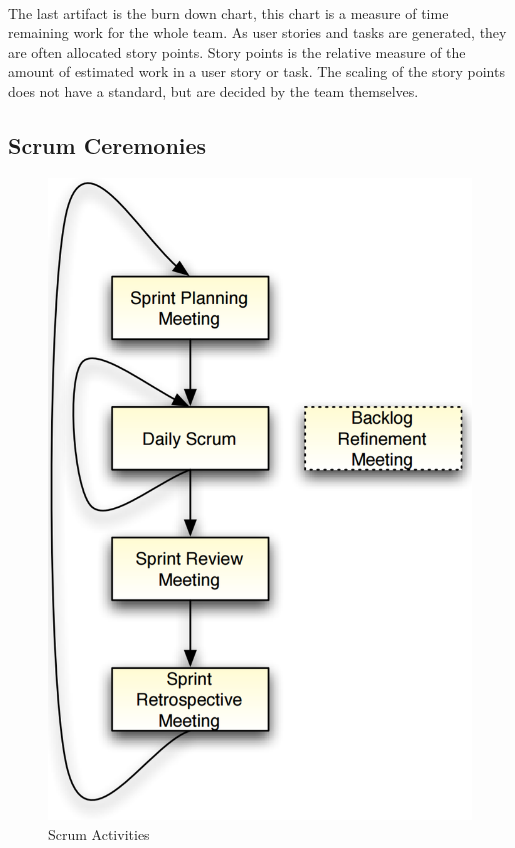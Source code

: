 \\
\newline
The last artifact is the burn down chart, this chart is a measure of time remaining work for the whole team. As user stories and tasks are generated, they are often allocated story points. Story points is the relative measure of the amount of estimated work in a user story or task. The scaling of the story points does not have a standard, but are decided by the team themselves.


\newpage
\subsection{Scrum Ceremonies}
\begin{figure}
  \begin{center}
    \includegraphics[scale=0.81]{VAPIQ-PICTURES/ScrumActivities.PNG}
  \end{center}
  \caption{Scrum Activities}
\end{figure}
